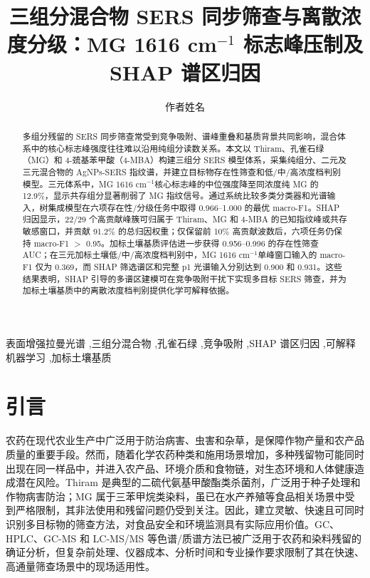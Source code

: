 \documentclass[preprint,12pt]{elsarticle}
\newcommand{\cmone}{cm$^{-1}$}
\begin{document}
\begin{frontmatter}

\title{三组分混合物 SERS 同步筛查与离散浓度分级：MG 1616 \texorpdfstring{cm$^{-1}$}{cm-1} 标志峰压制及 SHAP 谱区归因}

\author[inst1]{作者姓名}

\begin{abstract}
多组分残留的 SERS 同步筛查常受到竞争吸附、谱峰重叠和基质背景共同影响，混合体系中的核心标志峰强度往往难以沿用纯组分读数关系。本文以 Thiram、孔雀石绿（MG）和 4-巯基苯甲酸（4-MBA）构建三组分 SERS 模型体系，采集纯组分、二元及三元混合物的 AgNPs-SERS 指纹谱，并建立目标物存在性筛查和低/中/高浓度档判别模型。三元体系中，MG 1616 \cmone 核心标志峰的中位强度降至同浓度纯 MG 的 12.9\%，显示共存组分显著削弱了 MG 指纹信号。通过系统比较多类分类器和光谱输入，树集成模型在六项存在性/分级任务中取得 0.966--1.000 的最优 macro-F1。SHAP 归因显示，22/29 个高贡献峰簇可归属于 Thiram、MG 和 4-MBA 的已知指纹峰或共存敏感窗口，并贡献 91.2\% 的总归因权重；仅保留前 10\% 高贡献波数后，六项任务仍保持 macro-F1 $>$ 0.95。加标土壤基质评估进一步获得 0.956--0.996 的存在性筛查 AUC；在三元加标土壤低/中/高浓度档判别中，MG 1616 \cmone 单峰窗口输入的 macro-F1 仅为 0.369，而 SHAP 筛选谱区和完整 p1 光谱输入分别达到 0.900 和 0.931。这些结果表明，SHAP 引导的多谱区建模可在竞争吸附干扰下实现多目标 SERS 筛查，并为加标土壤基质中的离散浓度档判别提供化学可解释依据。
\end{abstract}

\begin{keyword}
表面增强拉曼光谱 \sep 三组分混合物 \sep 孔雀石绿 \sep 竞争吸附 \sep SHAP 谱区归因 \sep 可解释机器学习 \sep 加标土壤基质
\end{keyword}

\end{frontmatter}

\section{引言}

农药在现代农业生产中广泛用于防治病害、虫害和杂草，是保障作物产量和农产品质量的重要手段。然而，随着化学农药种类和施用场景增加，多种残留物可能同时出现在同一样品中，并进入农产品、环境介质和食物链，对生态环境和人体健康造成潜在风险\cite{ref1,ref2}。Thiram 是典型的二硫代氨基甲酸酯类杀菌剂，广泛用于种子处理和作物病害防治；MG 属于三苯甲烷类染料，虽已在水产养殖等食品相关场景中受到严格限制，其非法使用和残留问题仍受到关注\cite{ref22,ref23,ref24}。因此，建立灵敏、快速且可同时识别多目标物的筛查方法，对食品安全和环境监测具有实际应用价值。GC、HPLC、GC-MS 和 LC-MS/MS 等色谱/质谱方法已被广泛用于农药和染料残留的确证分析，但复杂前处理、仪器成本、分析时间和专业操作要求限制了其在快速、高通量筛查场景中的现场适用性\cite{ref2,ref5}。
\end{document}
